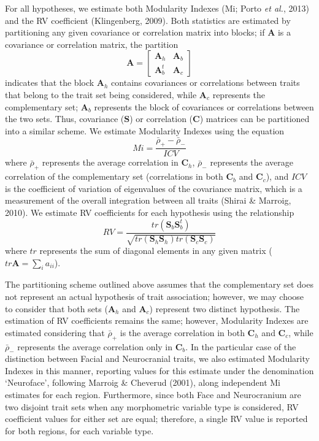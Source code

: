 \documentclass[12pt,]{article}
\begin{document}
For all hypotheses, we estimate both Modularity Indexes (Mi; Porto
\emph{et al.}, 2013) and the RV coefficient (Klingenberg, 2009). Both
statistics are estimated by partitioning any given covariance or
correlation matrix into blocks; if $\mathbf{A}$ is a covariance or
correlation matrix, the partition \[
\mathbf{A} =
\begin{bmatrix}
\mathbf{A}_h & \mathbf{A}_b \\
\mathbf{A}^t_b & \mathbf{A}_c
\end{bmatrix}
\] indicates that the block $\mathbf{A}_h$ contains covariances or
correlations between traits that belong to the trait set being
considered, while $\mathbf{A}_c$ represents the complementary set;
$\mathbf{A}_b$ represents the block of covariances or correlations
between the two sets. Thus, covariance ($\mathbf{S}$) or correlation
($\mathbf{C}$) matrices can be partitioned into a similar scheme. We
estimate Modularity Indexes using the equation \[
Mi = \frac {\bar{\rho}_{+} - \bar{\rho}_{-}} {ICV}
\] where $\bar{\rho}_{+}$ represents the average correlation in
$\mathbf{C}_h$, $\bar{\rho}_{-}$ represents the average correlation of
the complementary set (correlations in both $\mathbf{C}_b$ and
$\mathbf{C}_c$), and $ICV$ is the coefficient of variation of
eigenvalues of the covariance matrix, which is a measurement of the
overall integration between all traits (Shirai \& Marroig, 2010). We
estimate RV coefficients for each hypothesis using the relationship \[
RV = \frac{tr(\mathbf{S}_{b}\mathbf{S}^t_{b})}{\sqrt{tr(\mathbf{S}_h \mathbf{S}_h)tr(\mathbf{S}_c \mathbf{S}_c)}}
\] where $tr$ represents the sum of diagonal elements in any given
matrix ($tr \mathbf{A} = \sum_i a_{ii}$).

The partitioning scheme outlined above assumes that the complementary
set does not represent an actual hypothesis of trait association;
however, we may choose to consider that both sets ($\mathbf{A}_h$ and
$\mathbf{A}_c$) represent two distinct hypothesis. The estimation of RV
coefficients remains the same; however, Modularity Indexes are estimated
considering that $\bar{\rho}_{+}$ is the average correlation in both
$\mathbf{C}_h$ and $\mathbf{C}_c$, while $\bar{\rho}_{-}$ represents the
average correlation only in $\mathbf{C}_b$. In the particular case of
the distinction between Facial and Neurocranial traits, we also
estimated Modularity Indexes in this manner, reporting values for this
estimate under the denomination `Neuroface', following Marroig \&
Cheverud (2001), along independent Mi estimates for each region.
Furthermore, since both Face and Neurocranium are two disjoint trait
sets when any morphometric variable type is considered, RV coefficient
values for either set are equal; therefore, a single RV value is
reported for both regions, for each variable type.
\end{document}
